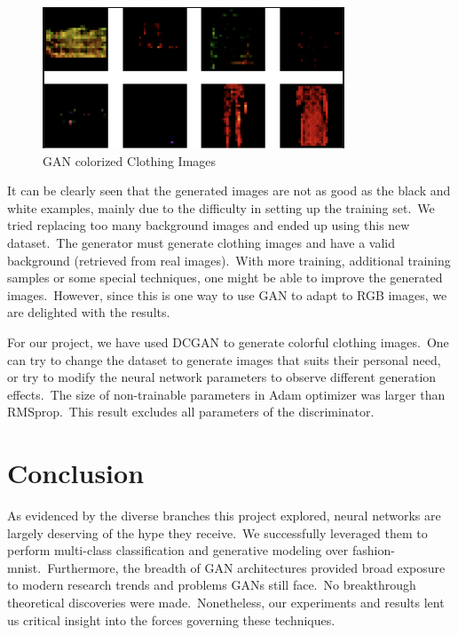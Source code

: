 \documentclass[conference]{IEEEtran}
\begin{document}
    \begin{figure}
        \caption{GAN colorized Clothing Images}
        \label{fig:colorized_result}
        \includegraphics[width=9cm]{learned_result.png}
        \centering
    \end{figure}

    It can be clearly seen that the generated images are not as good as the black and white examples, mainly due to the difficulty in setting up the training set.\ We tried replacing too many background images and ended up using this new dataset.\ The generator must generate clothing images and have a valid background (retrieved from real images).\ With more training, additional training samples or some special techniques, one might be able to improve the generated images.\ However, since this is one way to use GAN to adapt to RGB images, we are delighted with the results.

    For our project, we have used DCGAN to generate colorful clothing images.\ One can try to change the dataset to generate images that suits their personal need, or try to modify the neural network parameters to observe different generation effects.\ The size of non-trainable parameters in Adam optimizer was larger than RMSprop.\ This result excludes all parameters of the discriminator.\

    \section{Conclusion}\label{sec:conclusion}

    As evidenced by the diverse branches this project explored, neural networks are largely deserving of the hype they receive.\ We successfully leveraged them to perform multi-class classification and generative modeling over fashion-mnist.\ Furthermore, the breadth of GAN architectures provided broad exposure to modern research trends and problems GANs still face.\ No breakthrough theoretical discoveries were made.\ Nonetheless, our experiments and results lent us critical insight into the forces governing these techniques.

    
    
\end{document}

